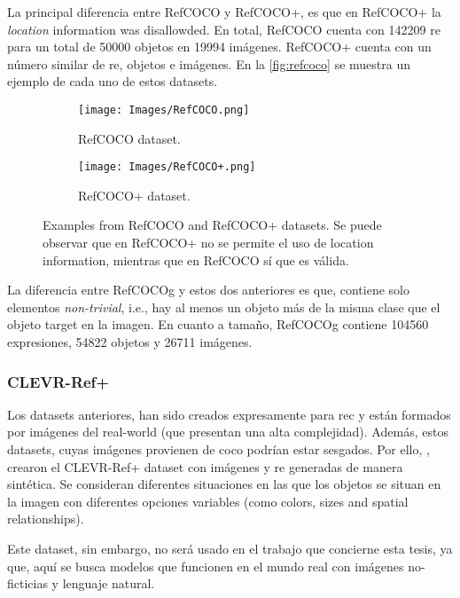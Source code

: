 La principal diferencia entre RefCOCO y RefCOCO+, es que en RefCOCO+ la
\emph{location} information was disallowded. En total, RefCOCO cuenta con
\num{142209} \gls{re} para un total de \num{50000} objetos en \num{19994}
imágenes. RefCOCO+ cuenta con un número similar de \gls{re}, objetos e
imágenes. En la \vref{fig:refcoco} se muestra un ejemplo de cada uno de estos
datasets.

\begin{figure}[ht]
  \centering
  \begin{subfigure}[t]{.45\textwidth}
    \centering
    \caption{RefCOCO dataset.}
    \texttt{[image: Images/RefCOCO.png]}
  \end{subfigure}
  \begin{subfigure}[t]{.45\textwidth}
    \centering
    \caption{RefCOCO+ dataset.}
    \texttt{[image: Images/RefCOCO+.png]}
  \end{subfigure}
  \caption[Examples from RefCOCO and RefCOCO+ datasets]{Examples from RefCOCO
    and RefCOCO+ datasets. Se puede observar que en RefCOCO+ no se permite el
    uso de location information, mientras que en RefCOCO sí que es válida.}
  \label{fig:refcoco}
\end{figure}

La diferencia entre RefCOCOg y estos dos anteriores es que, contiene solo
elementos \emph{non-trivial}, i.e., hay al menos un objeto más de la misma
clase que el objeto target en la imagen. En cuanto a tamaño, RefCOCOg contiene
\num{104560} expresiones, \num{54822} objetos y \num{26711} imágenes.

\subsubsection{CLEVR-Ref+}
Los datasets anteriores, han sido creados expresamente para \gls{rec} y están
formados por imágenes del real-world (que presentan una alta
complejidad). Además, estos datasets, cuyas imágenes provienen de \gls{coco}
podrían estar sesgados. Por ello, , crearon el CLEVR-Ref+
dataset con imágenes y \gls{re} generadas de manera sintética. Se consideran
diferentes situaciones en las que los objetos se situan en la imagen con
diferentes opciones variables (como colors, sizes and spatial relationships).

Este dataset, sin embargo, no será usado en el trabajo que concierne esta
tesis, ya que, aquí se busca modelos que funcionen en el mundo real con
imágenes no-ficticias y lenguaje natural.

